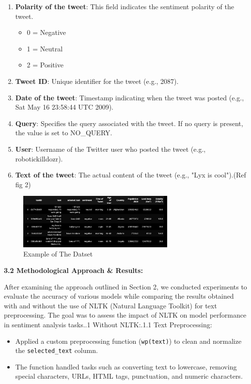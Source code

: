 \documentclass[a4paper]{article}
\theoremstyle{plain}
\theoremstyle{definition}
\begin{document}
\begin{enumerate}
    \item \textbf{Polarity of the tweet}: This field indicates the sentiment polarity of the tweet.
        \begin{itemize}
            \item 0 = Negative
            \item 1 = Neutral
            \item 2 = Positive
        \end{itemize}
    \item \textbf{Tweet ID}: Unique identifier for the tweet (e.g., 2087).
    \item \textbf{Date of the tweet}: Timestamp indicating when the tweet was posted (e.g., Sat May 16 23:58:44 UTC 2009).
    \item \textbf{Query}: Specifies the query associated with the tweet. If no query is present, the value is set to NO\_QUERY.
    \item \textbf{User}: Username of the Twitter user who posted the tweet (e.g., robotickilldozr).
    \item \textbf{Text of the tweet}: The actual content of the tweet (e.g., "Lyx is cool").(Ref fig 2)
\end{enumerate}
\begin{figure}[htbp]
  \centering
  \includegraphics[width=0.7\textwidth]{figs/6.jpg}
  \caption{Example of The Datset}
  \label{fig:confusion_matrix}
\end{figure}


\textbf{3.2 Methodological Approach \& Results:}

After examining the approach outlined in Section 2, we conducted experiments to evaluate the accuracy of various models while comparing the results obtained with and without the use of NLTK (Natural Language Toolkit) for text preprocessing. The goal was to assess the impact of NLTK on model performance in sentiment analysis tasks..1 Without NLTK:\vspace{0.2 cm}.1.1 Text Preprocessing:\newline \begin{itemize}
    \item Applied a custom preprocessing function (\texttt{wp(text)}) to clean and normalize the \texttt{selected\_text} column.
    \item The function handled tasks such as converting text to lowercase, removing special characters, URLs, HTML tags, punctuation, and numeric characters.
\end{itemize}
\end{document}
